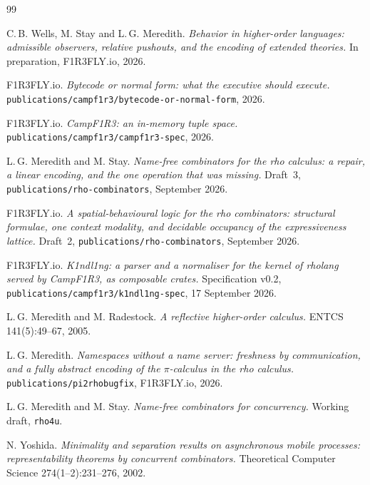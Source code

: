 \documentclass[11pt,a4paper]{article}
\newcommand{\code}[1]{\texttt{#1}}
\theoremstyle{definition}
\theoremstyle{plain}
\begin{document}
\begin{thebibliography}{99}

 C.\,B. Wells, M. Stay and L.\,G. Meredith.
\emph{Behavior in higher-order languages: admissible observers, relative
pushouts, and the encoding of extended theories.} In preparation,
F1R3FLY.io, 2026.

 F1R3FLY.io.
\emph{Bytecode or normal form: what the executive should execute.}
\code{publications/campf1r3/bytecode-or-normal-form}, 2026.

 F1R3FLY.io.
\emph{CampF1R3: an in-memory tuple space.}
\code{publications/campf1r3/campf1r3-spec}, 2026.

 L.\,G. Meredith and M. Stay.
\emph{Name-free combinators for the rho calculus: a repair, a linear encoding,
and the one operation that was missing.} Draft~3,
\code{publications/rho-combinators}, September 2026.

 F1R3FLY.io.
\emph{A spatial-behavioural logic for the rho combinators: structural
formulae, one context modality, and decidable occupancy of the expressiveness
lattice.} Draft~2, \code{publications/rho-combinators}, September 2026.

 F1R3FLY.io.
\emph{K1ndl1ng: a parser and a normaliser for the kernel of rholang served by
CampF1R3, as composable crates.} Specification v0.2,
\code{publications/campf1r3/k1ndl1ng-spec}, 17 September 2026.

 L.\,G. Meredith and M. Radestock.
\emph{A reflective higher-order calculus.} ENTCS 141(5):49--67, 2005.

 L.\,G. Meredith.
\emph{Namespaces without a name server: freshness by communication, and a
fully abstract encoding of the $\pi$-calculus in the rho calculus.}
\code{publications/pi2rhobugfix}, F1R3FLY.io, 2026.

 L.\,G. Meredith and M. Stay.
\emph{Name-free combinators for concurrency.} Working draft, \code{rho4u}.

 N. Yoshida.
\emph{Minimality and separation results on asynchronous mobile processes:
representability theorems by concurrent combinators.}
Theoretical Computer Science 274(1--2):231--276, 2002.

\end{thebibliography}
\end{document}
